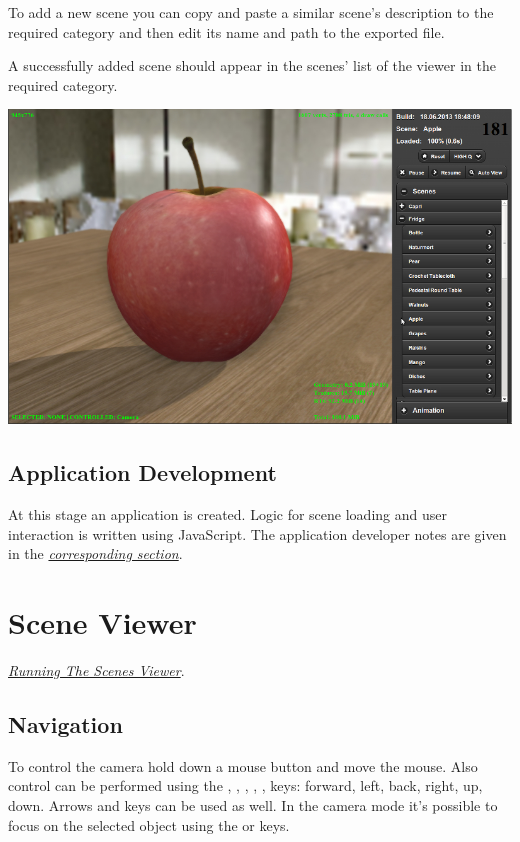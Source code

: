 \documentclass[a4paper,12pt,oneside]{sphinxmanual}
\begin{document}
To add a new scene you can copy and paste a similar scene's description to the required category and then edit its name and path to the exported file.

A successfully added scene should appear in the scenes' list of the viewer  in the required category.

{\hfill\includegraphics[width=1.000\linewidth]{viewer_apple_scene.jpg}\hfill}


\section{Application Development}
\label{workflow:id7}
At this stage an application is created. Logic for scene loading and user interaction is written using JavaScript. The application developer notes are given in the {\hyperref[developers:developers]{\emph{corresponding section}}}.


\chapter{Scene Viewer}
\label{viewer:viewer}\label{viewer:index-0}\label{viewer::doc}\label{viewer:id1}
{\hyperref[setup:getting-started-launching-viewer]{\emph{Running The Scenes Viewer}}}.


\section{Navigation}
\label{viewer:id2}
To control the camera hold down a mouse button and move the mouse. Also control can be performed using the , , , , ,  keys: forward, left, back, right, up, down. Arrows and  keys can be used as well. In the  camera mode it's possible to focus on the selected object using the  or  keys.
\end{document}
